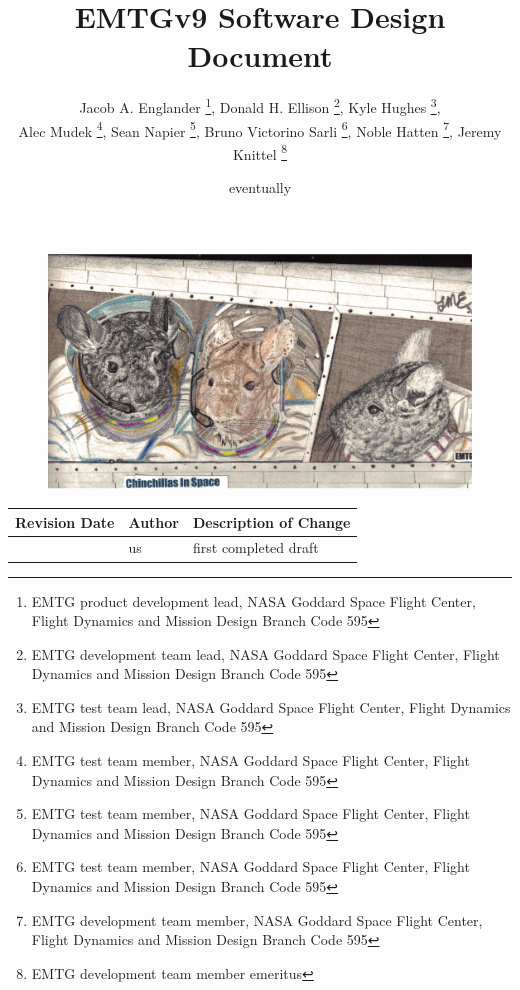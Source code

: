 \documentclass[11pt]{report}
\title{{\Huge EMTGv9 Software Design Document}}
\author
{	 
	Jacob A. Englander \thanks{EMTG product development lead, NASA Goddard Space Flight Center, Flight Dynamics and Mission Design Branch Code 595},
	Donald H. Ellison \thanks{EMTG development team lead, NASA Goddard Space Flight Center, Flight Dynamics and Mission Design Branch Code 595},
	Kyle Hughes \thanks{EMTG test team lead, NASA Goddard Space Flight Center, Flight Dynamics and Mission Design Branch Code 595},\\
	Alec Mudek \thanks{EMTG test team member, NASA Goddard Space Flight Center, Flight Dynamics and Mission Design Branch Code 595},
	Sean Napier \thanks{EMTG test team member, NASA Goddard Space Flight Center, Flight Dynamics and Mission Design Branch Code 595},
	Bruno Victorino Sarli \thanks{EMTG test team member, NASA Goddard Space Flight Center, Flight Dynamics and Mission Design Branch Code 595},
	Noble Hatten \thanks{EMTG development team member, NASA Goddard Space Flight Center, Flight Dynamics and Mission Design Branch Code 595},
	Jeremy Knittel \thanks{EMTG development team member emeritus}
}
\date{}
\begin{document}
\begin{titlepage}
\maketitle


\begin{figure}[H]
	\centering
	\includegraphics[width=0.75\linewidth]{./splashchilla.PNG}
\end{figure}

\begin{table}[H]
	\centering
	\begin{tabular}{|l|l|l|}
		\hline
		\textbf{Revision Date} & \textbf{Author} & \textbf{Description of Change} \\ \hline
		\date{eventually} & us & first completed draft \\
		\hline
	\end{tabular}
\end{table}
\end{titlepage}



\tableofcontents
\clearpage
\listoffigures
\clearpage
\listoftables

\clearpage
\setcounter{page}{1}









































\end{document}
